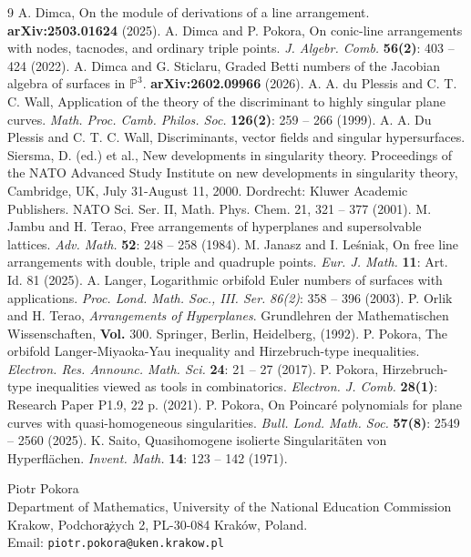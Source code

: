 \documentclass[11pt]{article}
\theoremstyle{plain}
\theoremstyle{definition}
\theoremstyle{remark}
\begin{document}
\begin{thebibliography}{9}
A. Dimca, On the module of derivations of a line arrangement. \textbf{arXiv:2503.01624} (2025).
A. Dimca and P. Pokora, On conic-line arrangements with nodes, tacnodes, and ordinary triple points. \textit{J. Algebr. Comb.} \textbf{56(2)}: 403 -- 424 (2022).
A. Dimca and G. Sticlaru, Graded Betti numbers of the Jacobian algebra of surfaces in $\mathbb{P}^{3}$. \textbf{arXiv:2602.09966} (2026).
A. A. du Plessis and  C. T. C. Wall, Application of the theory of the discriminant to highly singular plane curves. \textit{Math. Proc. Camb. Philos. Soc.} \textbf{126(2)}: 259 -- 266 (1999).
A. A. Du Plessis and  C. T. C. Wall, Discriminants, vector fields and singular hypersurfaces. Siersma, D. (ed.) et al., New developments in singularity theory. Proceedings of the NATO Advanced Study Institute on new developments in singularity theory, Cambridge, UK, July 31-August 11, 2000. Dordrecht: Kluwer Academic Publishers. NATO Sci. Ser. II, Math. Phys. Chem. 21, 321 -- 377 (2001).
M. Jambu and H. Terao, Free arrangements of hyperplanes and supersolvable lattices. \textit{Adv. Math.} \textbf{52}: 248 -- 258 (1984).
M. Janasz and I. Le\'sniak, On free line arrangements with double, triple and quadruple points. \textit{Eur. J. Math.} \textbf{11}: Art. Id. 81 (2025).
A. Langer, Logarithmic orbifold Euler numbers of surfaces with applications. \textit{Proc. Lond. Math. Soc., III. Ser.} \textit{86(2)}: 358 -- 396 (2003).
P. Orlik and H. Terao, \textit{Arrangements of Hyperplanes}. Grundlehren der Mathematischen Wissenschaften, \textbf{Vol.} 300. Springer, Berlin, Heidelberg, (1992).
P. Pokora, The orbifold Langer-Miyaoka-Yau inequality and Hirzebruch-type inequalities. \textit{Electron. Res. Announc. Math. Sci.} \textbf{24}: 21 -- 27 (2017).
P. Pokora, Hirzebruch-type inequalities viewed as tools in combinatorics. \textit{Electron. J. Comb.} \textbf{28(1)}: Research Paper P1.9, 22 p. (2021).
P. Pokora, On Poincar\'e polynomials for plane curves with quasi-homogeneous singularities. \textit{Bull. Lond. Math. Soc.} \textbf{57(8)}: 2549 -- 2560 (2025).
 K. Saito, Quasihomogene isolierte Singularit\"aten von Hyperfl\"achen. \textit{Invent. Math.} \textbf{14}: 123 -- 142 (1971).
\end{thebibliography}
\bigskip
Piotr Pokora\\
\noindent
Department of Mathematics,
University of the National Education Commission Krakow,
Podchor\c a\.zych 2,
PL-30-084 Krak\'ow, Poland. \\
Email: \texttt{piotr.pokora@uken.krakow.pl}
\end{document}
